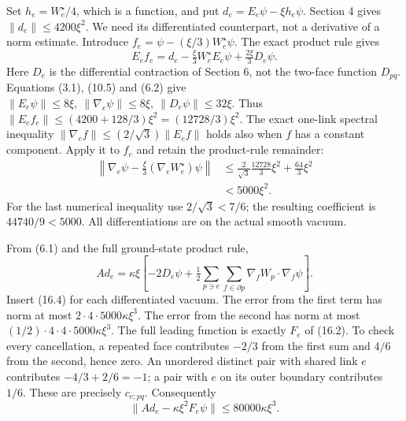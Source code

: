 \documentclass[
]{article}
\begin{document}
Set \(h_e=W_e^\star/4\), which is a function, and put
\(d_e=E_e\psi-\xi h_e\psi\). Section 4 gives \(\|d_e\|\le4200\xi^2\). We
need its differentiated counterpart, not a derivative of a norm
estimate. Introduce \(f_e=\psi-(\xi/3)W_e^\star\psi\). The exact product
rule gives \[
E_ef_e=d_e-\tfrac{\xi}{3}W_e^\star E_e\psi
                         +\tfrac{2\xi}{3}D_e\psi .
\] Here \(D_e\) is the differential contraction of Section 6, not the
two-face function \(D_{pq}\). Equations (3.1), (10.5) and (6.2) give
\(\|E_e\psi\|\le8\xi,\ \|\nabla_e\psi\|\le8\xi,\
\|D_e\psi\|\le32\xi\). Thus
\(\|E_ef_e\|\le(4200+128/3)\xi^2=(12728/3)\xi^2\). The exact one-link
spectral inequality \(\|\nabla_ef\|\le(2/\sqrt3)\|E_ef\|\) holds also
when \(f\) has a constant component. Apply it to \(f_e\) and retain the
product-rule remainder: \[
\begin{split}
\left\|\nabla_e\psi-\tfrac{\xi}{3}
                    (\nabla_eW_e^\star)\psi\right\|
&\le\frac{2}{\sqrt3}\frac{12728}{3}\xi^2
                              +\frac{64}{3}\xi^2\\
&<5000\xi^2 .
\end{split}                                                  \tag{16.4}
\] For the last numerical inequality use \(2/\sqrt3<7/6\); the resulting
coefficient is \(44740/9<5000\). All differentiations are on the actual
smooth vacuum.

From (6.1) and the full ground-state product rule, \[
Ad_e=\kappa\xi\left[
 -2D_e\psi+\tfrac12
   \sum_{p\ni e}\sum_{f\in\partial p}
          \nabla_fW_p\cdot\nabla_f\psi\right].
                                                               \tag{16.5}
\] Insert (16.4) for each differentiated vacuum. The error from the
first term has norm at most \(2\cdot4\cdot5000\kappa\xi^3\). The error
from the second has norm at most
\((1/2)\cdot4\cdot4\cdot5000\kappa\xi^3\). The full leading function is
exactly \(F_e\) of (16.2). To check every cancellation, a repeated face
contributes \(-2/3\) from the first sum and \(4/6\) from the second,
hence zero. An unordered distinct pair with shared link \(e\)
contributes \(-4/3+2/6=-1\); a pair with \(e\) on its outer boundary
contributes \(1/6\). These are precisely \(c_{e;pq}\). Consequently \[
\|Ad_e-\kappa\xi^2F_e\psi\|\le80000\kappa\xi^3.               \tag{16.6}
\]
\end{document}
